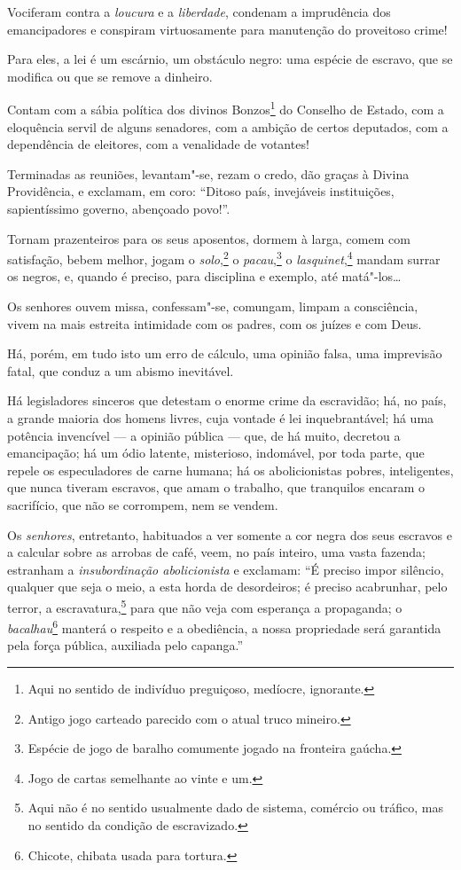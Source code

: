 Vociferam contra a \emph{loucura} e a \emph{liberdade}, condenam a
imprudência dos emancipadores e conspiram virtuosamente para manutenção
do proveitoso crime!

Para eles, a lei é um escárnio, um obstáculo negro: uma espécie de
escravo, que se modifica ou que se remove a dinheiro.

Contam com a sábia política dos divinos Bonzos\footnote{Aqui no
  sentido de indivíduo preguiçoso, medíocre, ignorante.} do Conselho de
Estado, com a eloquência servil de alguns senadores, com a ambição de
certos deputados, com a dependência de eleitores, com a venalidade de
votantes!

Terminadas as reuniões, levantam"-se, rezam o credo, dão graças à Divina
Providência, e exclamam, em coro: ``Ditoso país, invejáveis instituições,
sapientíssimo governo, abençoado povo!''.

Tornam prazenteiros para os seus aposentos, dormem à larga, comem com
satisfação, bebem melhor, jogam o \emph{solo},\footnote{Antigo jogo
  carteado parecido com o atual truco mineiro.} o
\emph{pacau},\footnote{Espécie de jogo de baralho comumente jogado na
  fronteira gaúcha.} o \emph{lasquinet},\footnote{Jogo de cartas
  semelhante ao vinte e um.} mandam surrar os negros, e,
quando é preciso, para disciplina e exemplo, até matá"-los\ldots{}


Os senhores ouvem missa, confessam"-se, comungam, limpam a consciência,
vivem na mais estreita intimidade com os padres, com os juízes e com
Deus.

Há, porém, em tudo isto um erro de cálculo, uma opinião falsa, uma
imprevisão fatal, que conduz a um abismo inevitável.

Há legisladores sinceros que detestam o enorme crime da escravidão; há,
no país, a grande maioria dos homens livres, cuja vontade é lei
inquebrantável; há uma potência invencível --- a opinião pública ---
que, de há muito, decretou a emancipação; há um ódio latente,
misterioso, indomável, por toda parte, que repele os especuladores de
carne humana; há os abolicionistas pobres, inteligentes, que nunca
tiveram escravos, que amam o trabalho, que tranquilos encaram o
sacrifício, que não se corrompem, nem se vendem.

Os \emph{senhores}, entretanto, habituados a ver somente a cor negra dos
seus escravos e a calcular sobre as arrobas de café, veem, no país
inteiro, uma vasta fazenda; estranham a \emph{insubordinação
abolicionista} e exclamam: ``É preciso impor silêncio, qualquer que seja
o meio, a esta horda de desordeiros; é preciso acabrunhar, pelo terror,
a escravatura,\footnote{Aqui não é no sentido usualmente dado de
  sistema, comércio ou tráfico, mas no sentido da condição de
  escravizado.} para que não veja com esperança a propaganda; o
\emph{bacalhau}\footnote{Chicote, chibata usada para tortura.} manterá
o respeito e a obediência, a nossa propriedade será garantida pela força
pública, auxiliada pelo capanga.''

